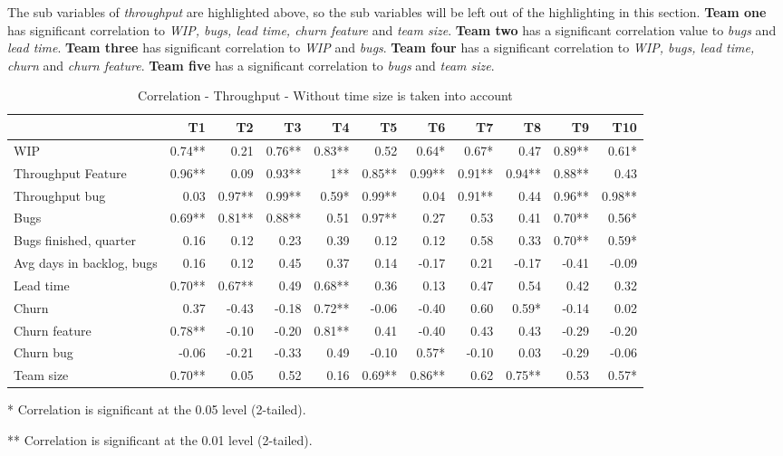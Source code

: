 \documentclass[UKenglish]{ifimaster}  %
\begin{document}
The sub variables of \textit{throughput} are highlighted above, so the sub variables will be left out of the highlighting in this section.
\textbf{Team one} has significant correlation to \textit{WIP, bugs, lead time, churn feature} and \textit{team size}. \textbf{Team two} has a significant correlation value to \textit{bugs} and \textit{lead time}. \textbf{Team three} has significant correlation to \textit{WIP} and \textit{bugs}. \textbf{Team four} has a significant correlation to \textit{WIP, bugs, lead time, churn} and \textit{churn feature}.  \textbf{Team five} has a significant correlation to \textit{bugs} and \textit{team size}.

\begin{table}[!htbp]
 \begin{adjustwidth}{-1.5cm}{}
 \centering
 \begin{tabular}{|l|r|r|r|r|r|r|r|r|r|r|}
\hline
 & \bf{T1} & \bf{T2} & \bf{T3} & \bf{T4} & \bf{T5} & \bf{T6} & \bf{T7} & \bf{T8} & \bf{T9} & \bf{T10}\\ \hline
 WIP   & 0.74** & 0.21 & 0.76** & 0.83** & 0.52 & 0.64* & 0.67* & 0.47 & 0.89** & 0.61* \\ \hline
 Throughput Feature   & 0.96** & 0.09 & 0.93** & 1** & 0.85** & 0.99** & 0.91** & 0.94** & 0.88** & 0.43 \\ \hline
 Throughput bug   & 0.03 & 0.97** & 0.99** & 0.59* & 0.99** & 0.04 & 0.91** & 0.44 & 0.96** & 0.98** \\ \hline
 Bugs   & 0.69** & 0.81** & 0.88** & 0.51 & 0.97** & 0.27 & 0.53 & 0.41 & 0.70** & 0.56* \\ \hline
 Bugs finished, quarter   & 0.16 & 0.12 & 0.23 & 0.39 & 0.12 & 0.12 & 0.58 & 0.33 & 0.70** & 0.59* \\ \hline
 Avg days in backlog, bugs   & 0.16 & 0.12 & 0.45 & 0.37 & 0.14 & -0.17 & 0.21 & -0.17 & -0.41 & -0.09 \\ \hline
 Lead time   & 0.70** & 0.67** & 0.49 & 0.68** & 0.36 & 0.13 & 0.47 & 0.54 & 0.42 & 0.32 \\ \hline
 Churn   & 0.37 & -0.43 & -0.18 & 0.72** & -0.06 & -0.40 & 0.60 & 0.59* & -0.14 & 0.02 \\ \hline
 Churn feature   & 0.78** & -0.10 & -0.20 & 0.81** & 0.41 & -0.40 & 0.43 & 0.43 & -0.29 & -0.20 \\ \hline
 Churn bug   & -0.06 & -0.21 & -0.33 & 0.49 & -0.10 & 0.57* & -0.10 & 0.03 & -0.29 & -0.06 \\ \hline
 Team size   & 0.70** & 0.05 & 0.52 & 0.16 & 0.69** & 0.86** & 0.62 & 0.75** & 0.53 & 0.57* \\ \hline
\end{tabular}
 \caption{Correlation - Throughput - Without time size is taken into account}
 \label{corr:TP}
 \centerline {* Correlation is significant at the 0.05 level (2-tailed).}
\centerline{** Correlation is significant at the 0.01 level (2-tailed).}
\end{adjustwidth}
\end{table}
\end{document}
